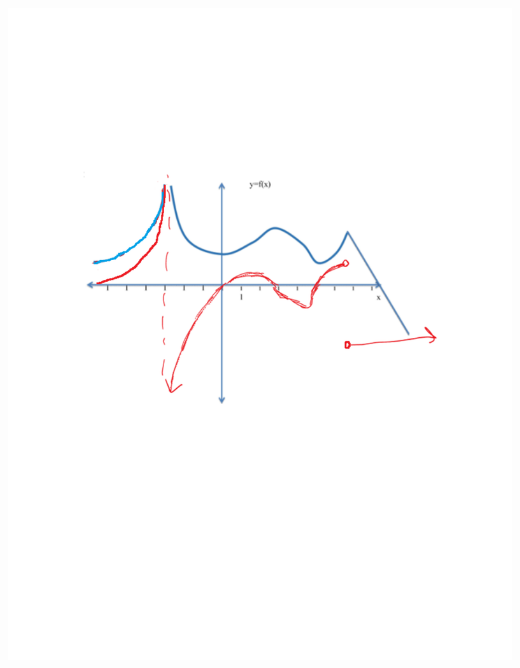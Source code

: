 \documentclass[handout,nooutcomes]{ximera}
\begin{document}
\begin{problem}
\begin{freeResponse}
			\begin{image}
			\includegraphics[trim= 220 410 250 195]{Figure6.pdf}
			\end{image}
			
		\end{freeResponse}
		
\end{problem}
\end{document}
